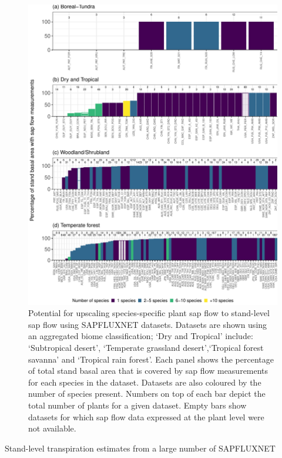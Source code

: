 \documentclass[11pt,twoside]{reedthesis}
\begin{document}
\setlength{\abovecaptionskip}{0pt}
\begin{figure}[H]

{\centering \includegraphics[width=1\linewidth]{figure/CH3/Figure9} 

}

\caption[Potential for upscaling species-specific plant sap flow to stand-level.]{Potential for upscaling species-specific plant sap flow to stand-level sap flow using SAPFLUXNET datasets. Datasets are shown using an aggregated biome classification; ‘Dry and Tropical’ include: ‘Subtropical desert’, ‘Temperate grassland desert’,‘Tropical forest savanna’ and ‘Tropical rain forest’. Each panel shows the percentage of total stand basal area that is covered by sap flow measurements for each species in the dataset. Datasets are also coloured by the number of species present. Numbers on top of each bar depict the total number of plants for a given dataset. Empty bars show datasets for which sap flow data expressed at the plant level were not available.}\label{fig:Ch2plot9}
\end{figure}
Stand-level transpiration estimates from a large number of SAPFLUXNET
\end{document}
